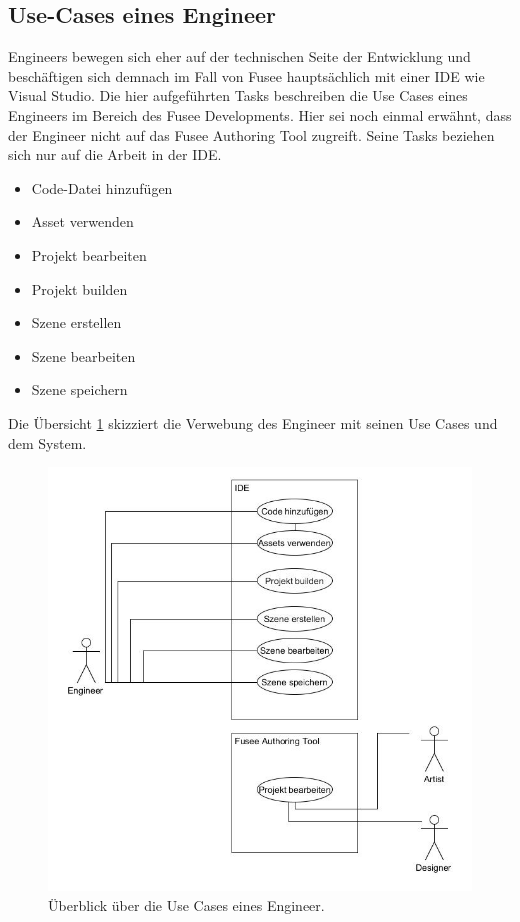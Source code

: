 \documentclass[pagesize, paper=a4, fontsize=12pt, titlepage=true, headings=small, headnosepline, abstractoff, liststotoc, nochapterprefix, plainheadsepline, twoside]{scrreprt}
\begin{document}
\subsection{Use-Cases eines Engineer}
Engineers bewegen sich eher auf der technischen Seite der Entwicklung und beschäftigen sich demnach im Fall von Fusee hauptsächlich mit einer IDE wie Visual Studio. Die hier aufgeführten Tasks beschreiben die Use Cases eines Engineers im Bereich des Fusee Developments. Hier sei noch einmal erwähnt, dass der Engineer nicht auf das Fusee Authoring Tool zugreift. Seine Tasks beziehen sich nur auf die Arbeit in der IDE.

\begin{itemize}
\item Code-Datei hinzufügen
\item Asset verwenden
\item Projekt bearbeiten
\item Projekt builden
\item Szene erstellen
\item Szene bearbeiten
\item Szene speichern
\end{itemize}

Die Übersicht \ref{UseCaseEngineer} skizziert die Verwebung des Engineer mit seinen Use Cases und dem System.
\begin{figure}[ht]
	\centering
	\includegraphics[width=\linewidth]{Bilder/UseCase_Engineer.jpg}
	\caption{Überblick über die Use Cases eines Engineer.}
	\label{UseCaseEngineer}
\end{figure}
\end{document}
